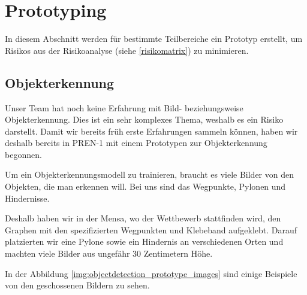 \documentclass[../main.tex]{subfiles}
\begin{document}
\newpage
\section{Prototyping}

In diesem Abschnitt werden für bestimmte Teilbereiche ein Prototyp erstellt,
um Risikos aus der Risikoanalyse (siehe \ref{risikomatrix}) zu minimieren.

\subsection{Objekterkennung}

Unser Team hat noch keine Erfahrung mit Bild- beziehungsweise Objekterkennung.
Dies ist ein sehr komplexes Thema, weshalb es ein Risiko darstellt.
Damit wir bereits früh erste Erfahrungen sammeln können, haben wir deshalb bereits in PREN-1 mit einem Prototypen zur Objekterkennung begonnen.

Um ein Objekterkennungsmodell zu trainieren, braucht es viele Bilder von den Objekten, die man erkennen will. Bei uns sind das Wegpunkte, Pylonen und Hindernisse.

Deshalb haben wir in der Mensa, wo der Wettbewerb stattfinden wird, den Graphen mit den spezifizierten Wegpunkten und Klebeband aufgeklebt. Darauf platzierten wir eine Pylone sowie ein Hindernis an verschiedenen Orten und machten viele Bilder aus ungefähr 30 Zentimetern Höhe.

In der Abbildung \ref{img:objectdetection_prototype_images} sind einige Beispiele von den geschossenen Bildern zu sehen.
\end{document}
